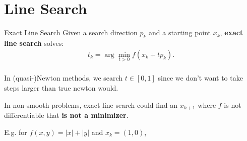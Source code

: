 \documentclass{beamer}
\begin{document}
\section{Line Search}
\begin{frame}{Exact Line Search}
    Given a search direction $p_k$ and a starting point $x_k$,
    \textbf{exact line search} solves:
    \begin{align*}
        t_k = \arg \min_{t > 0} f(x_k + t p_k).
    \end{align*}
    \\

     {
        \vspace{0.5em}
        In (quasi-)Newton methods, we search $t \in [0, 1]$
        since we don't want to take steps larger
        than true newton would.
    }
     {
        In non-smooth problems, exact line search could
        find an $x_{k + 1}$ where $f$ is not differentiable
        that \textbf{is not a minimizer}.
        \\
        \vspace{0.5em}

        E.g. for $f(x, y) = |x| + |y|$ and $x_k = (1, 0)$,
    }
\end{frame}
\end{document}
